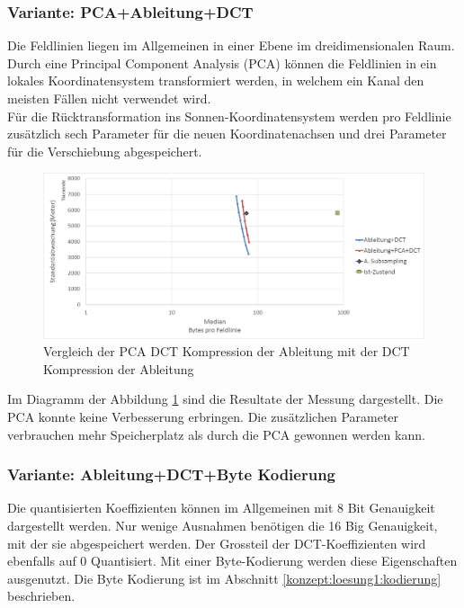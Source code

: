 \subsubsection{Variante: PCA+Ableitung+DCT}
Die Feldlinien liegen im Allgemeinen in einer Ebene im dreidimensionalen Raum. Durch eine Principal Component Analysis (PCA)\cite{abdi2010principal} können die Feldlinien in ein lokales Koordinatensystem transformiert werden, in welchem ein Kanal den meisten Fällen nicht verwendet wird.\\
Für die Rücktransformation ins Sonnen-Koordinatensystem werden pro Feldlinie zusätzlich sech Parameter für die neuen Koordinatenachsen und drei Parameter für die Verschiebung abgespeichert.

\begin{figure}[!htbp]
	\center
	\includegraphics[width=1\textwidth,keepaspectratio]{./pictures/resultate/loesung1/loesung1-4/loesung1_4.png}
	\caption{Vergleich der PCA DCT Kompression der Ableitung mit der DCT Kompression der Ableitung}
	\label{resultate:loesung1:dct:pca}
\end{figure}
Im Diagramm der Abbildung \ref{resultate:loesung1:dct:pca} sind die Resultate der Messung dargestellt. Die PCA konnte keine Verbesserung erbringen. Die zusätzlichen Parameter verbrauchen mehr Speicherplatz als durch die PCA gewonnen werden kann.

\subsubsection{Variante: Ableitung+DCT+Byte Kodierung} \label{resultate:loesung1:ableitung_dct_kodierung}
Die quantisierten Koeffizienten können im Allgemeinen mit 8 Bit Genauigkeit dargestellt werden. Nur wenige Ausnahmen benötigen die 16 Big Genauigkeit, mit der sie abgespeichert werden. Der Grossteil der DCT-Koeffizienten wird ebenfalls auf 0 Quantisiert. Mit einer Byte-Kodierung werden diese Eigenschaften ausgenutzt. Die Byte Kodierung ist im Abschnitt \ref{konzept:loesung1:kodierung} beschrieben.

